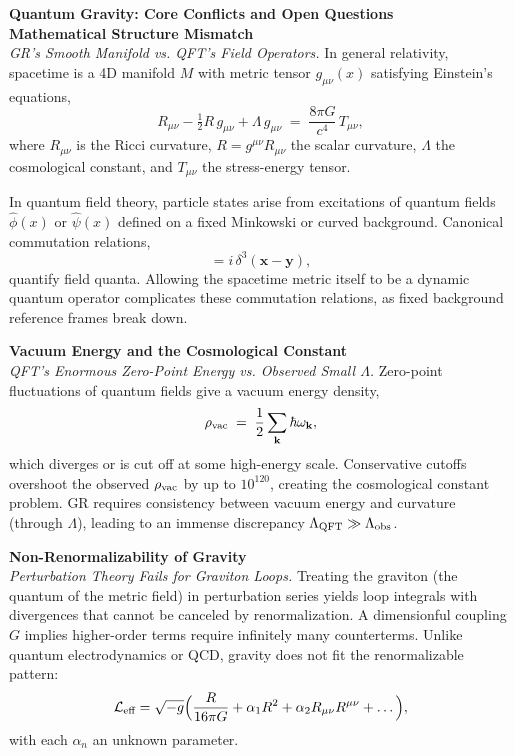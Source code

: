 
\begin{technical}
    {\Large\textbf{Quantum Gravity: Core Conflicts and Open Questions}}\\[0.5em]

    \noindent\textbf{Mathematical Structure Mismatch}\\[0.25em]
    \textit{GR's Smooth Manifold vs. QFT's Field Operators.}
    In general relativity, spacetime is a 4D manifold $M$ with metric tensor $g_{\mu\nu}(x)$ satisfying Einstein's equations,
    \begin{equation}
        R_{\mu\nu} - \tfrac{1}{2}R\,g_{\mu\nu} + \Lambda\,g_{\mu\nu} \;=\; \frac{8\pi G}{c^4}\,T_{\mu\nu},
    \end{equation}
    where $R_{\mu\nu}$ is the Ricci curvature, $R = g^{\mu\nu}R_{\mu\nu}$ the scalar curvature, $\Lambda$ the cosmological constant, and $T_{\mu\nu}$ the stress-energy tensor. 

    In quantum field theory, particle states arise from excitations of quantum fields $\hat{\phi}(x)$ or $\hat{\psi}(x)$ defined on a fixed Minkowski or curved background. Canonical commutation relations,
    \begin{equation}
        [\hat{\phi}(t,\mathbf{x}),\,\hat{\pi}(t,\mathbf{y})] = i\,\delta^3(\mathbf{x}-\mathbf{y}),
    \end{equation}
    quantify field quanta. Allowing the spacetime metric itself to be a dynamic quantum operator complicates these commutation relations, as fixed background reference frames break down.

    \noindent\textbf{Vacuum Energy and the Cosmological Constant}\\[0.25em]
    \textit{QFT's Enormous Zero-Point Energy vs. Observed Small $\Lambda$.}
    Zero-point fluctuations of quantum fields give a vacuum energy density,
    \begin{equation}
        \rho_{\rm vac} \;=\; \frac{1}{2}\sum_{\mathbf{k}}\hbar\omega_{\mathbf{k}},
    \end{equation}
    which diverges or is cut off at some high-energy scale. Conservative cutoffs overshoot the observed $\rho_{\rm vac}$ by up to $10^{120}$, creating the cosmological constant problem. GR requires consistency between vacuum energy and curvature (through $\Lambda$), leading to an immense discrepancy $\Lambda_{\rm QFT} \gg \Lambda_{\rm obs}$.

    \noindent\textbf{Non-Renormalizability of Gravity}\\[0.25em]
    \textit{Perturbation Theory Fails for Graviton Loops.}
    Treating the graviton (the quantum of the metric field) in perturbation series yields loop integrals with divergences that cannot be canceled by renormalization. A dimensionful coupling $G$ implies higher-order terms require infinitely many counterterms. Unlike quantum electrodynamics or QCD, gravity does not fit the renormalizable pattern:
    \[
        \mathcal{L}_\text{eff} = \sqrt{-g}\Bigl(\frac{R}{16\pi G} + \alpha_1 R^2 + \alpha_2 R_{\mu\nu}R^{\mu\nu} + \dots\Bigr),
    \]
    with each $\alpha_n$ an unknown parameter.


\end{technical}
